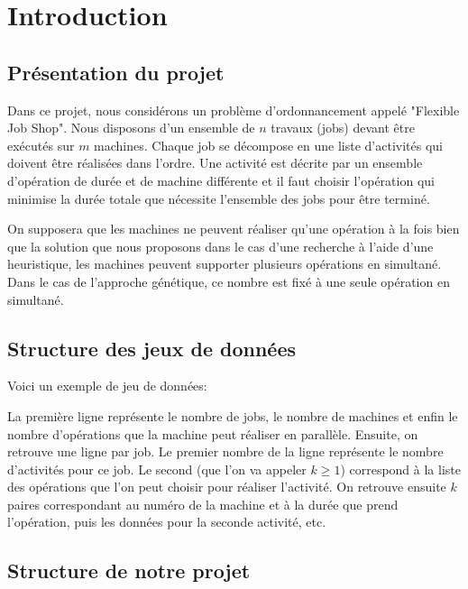 \section{Introduction}

\subsection{Présentation du projet}

Dans ce projet, nous considérons un problème d'ordonnancement appelé "Flexible Job Shop". Nous disposons d'un ensemble de $n$ travaux (jobs) devant être exécutés sur $m$ machines. Chaque job se décompose en une liste d'activités qui doivent être réalisées dans l'ordre. Une activité est décrite par un ensemble d'opération de durée et de machine différente et il faut choisir l'opération qui minimise la durée totale que nécessite l'ensemble des jobs pour être terminé.

On supposera que les machines ne peuvent réaliser qu'une opération à la fois bien que la solution que nous proposons dans le cas d'une recherche à l'aide d'une heuristique, les machines peuvent supporter plusieurs opérations en simultané. Dans le cas de l'approche génétique, ce nombre est fixé à une seule opération en simultané.

\subsection{Structure des jeux de données}

Voici un exemple de jeu de données:


La première ligne représente le nombre de jobs, le nombre de machines et enfin le nombre d'opérations que la machine peut réaliser en parallèle. Ensuite, on retrouve une ligne par job. Le premier nombre de la ligne représente le nombre d'activités pour ce job. Le second (que l'on va appeler $k \geq 1$) correspond à la liste des opérations que l'on peut choisir pour réaliser l'activité. On retrouve ensuite $k$ paires correspondant au numéro de la machine et à la durée que prend l'opération, puis les données pour la seconde activité, etc. 

\subsection{Structure de notre projet}

